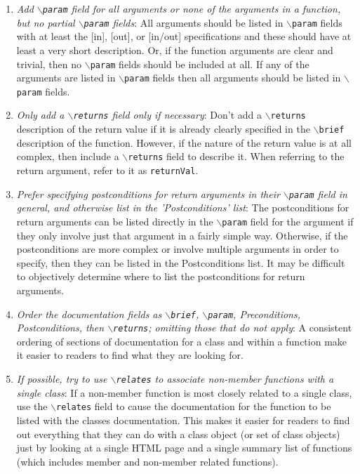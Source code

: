 \begin{enumerate}
{}\item\textit{Add {}\texttt{$\backslash$param} field for all arguments or
none of the arguments in a function, but no partial
{}\texttt{$\backslash$param} fields}: All arguments should be listed in
{}\texttt{$\backslash$param} fields with at least the [in], [out], or [in/out]
specifications and these should have at least a very short description.  Or,
if the function arguments are clear and trivial, then no
{}\texttt{$\backslash$param} fields should be included at all.  If any of the
arguments are listed in {}\texttt{$\backslash$param} fields then all
arguments should be listed in {}\texttt{$\backslash$param} fields.

{}\item\textit{Only add a {}\texttt{$\backslash$returns} field only if
necessary}: Don't add a {}\texttt{$\backslash$returns} description of the
return value if it is already clearly specified in the
{}\texttt{$\backslash$brief} description of the function.  However, if the
nature of the return value is at all complex, then include a
{}\texttt{$\backslash$returns} field to describe it.  When referring to the
return argument, refer to it as {}\texttt{returnVal}.

{}\item\textit{Prefer specifying postconditions for return arguments in their
{}\texttt{$\backslash$param} field in general, and otherwise list in the
'Postconditions' list}: The postconditions for return arguments can be listed
directly in the {}\texttt{$\backslash$param} field for the argument if they
only involve just that argument in a fairly simple way.  Otherwise, if the
postconditions are more complex or involve multiple arguments in order to
specify, then they can be listed in the Postconditions list.  It may be
difficult to objectively determine where to list the postconditions for return
arguments.

{}\item\textit{Order the documentation fields as {}\texttt{$\backslash$brief},
{}\texttt{$\backslash$param}, Preconditions, Postconditions,
then {}\texttt{$\backslash$returns}; omitting those that do not apply}: A
consistent ordering of sections of documentation for a class and within a
function make it easier to readers to find what they are looking for.

{}\item\textit{If possible, try to use {}\texttt{$\backslash$relates} to
associate non-member functions with a single class}: If a non-member function
is most closely related to a single class, use the
{}\texttt{$\backslash$relates} field to cause the documentation for the
function to be listed with the classes documentation.  This makes it easier
for readers to find out everything that they can do with a class object (or
set of class objects) just by looking at a single HTML page and a single
summary list of functions (which includes member and non-member related
functions).


\end{enumerate}
